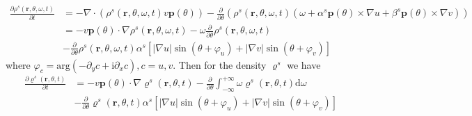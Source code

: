 \documentclass{article}
\begin{document}
\begin{enumerate}
    \begin{equation}
        \begin{aligned}
            \frac{\partial \rho ^s\left( \mathbf{r},\theta ,\omega ,t \right)}{\partial t}&=-\nabla \cdot \left( \rho ^s\left( \mathbf{r},\theta ,\omega ,t \right) v\mathbf{p}\left( \theta \right) \right) -\frac{\partial}{\partial \theta}\left( \rho ^s\left( \mathbf{r},\theta ,\omega ,t \right) \left( \omega +\alpha ^s\mathbf{p}\left( \theta \right) \times \nabla u+\beta ^s\mathbf{p}\left( \theta \right) \times \nabla v \right) \right)\\
            &=-v\mathbf{p}\left( \theta \right) \cdot \nabla \rho ^s\left( \mathbf{r},\theta ,\omega ,t \right) -\omega \frac{\partial}{\partial \theta}\rho ^s\left( \mathbf{r},\theta ,\omega ,t \right)\\
            &-\frac{\partial}{\partial \theta}\rho ^s\left( \mathbf{r},\theta ,\omega ,t \right) \alpha ^s\left[ \left| \nabla u \right|\sin \left( \theta +\varphi _u \right) +\left| \nabla v \right|\sin \left( \theta +\varphi _v \right) \right]
        \end{aligned}
    \end{equation}
    where $\varphi _c=\mathrm{arg}\left( -\partial _yc+\mathrm{i}\partial _xc \right) , c=u, v$. Then for the density $\varrho ^s$ we have
    \begin{equation}
        \label{eq:coarseDensityChemotactic}
        \begin{aligned}
            \frac{\partial \varrho ^s\left( \mathbf{r},\theta ,t \right)}{\partial t}&=-v\mathbf{p}\left( \theta \right) \cdot \nabla \varrho ^s\left( \mathbf{r},\theta ,t \right) -\frac{\partial}{\partial \theta}\int_{-\infty}^{+\infty}{\omega \varrho ^s\left( \mathbf{r},\theta ,t \right) \mathrm{d}\omega}\\
            &-\frac{\partial}{\partial \theta}\varrho ^s\left( \mathbf{r},\theta ,t \right) \alpha ^s\left[ \left| \nabla u \right|\sin \left( \theta +\varphi _u \right) +\left| \nabla v \right|\sin \left( \theta +\varphi _v \right) \right]\\
        \end{aligned}
    \end{equation}
\end{enumerate}

\end{document}
